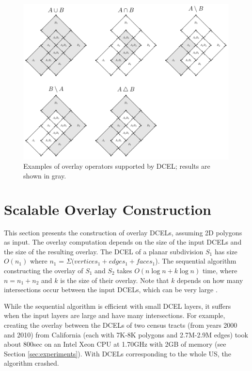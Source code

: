 \begin{figure}
    \centering
    \includegraphics[width=\textwidth]{chapterSDCEL/dcel_operators/dcel_operators}
    \caption{Examples of overlay operators supported by DCEL; results are shown in gray.}
    \label{fig:dcel_operators}
\end{figure}

\section{Scalable Overlay Construction}\label{sec:methods}
This section presents the construction of overlay DCELs, assuming 2D polygons as input. The overlay computation depends on the size of the input DCELs and the size of the resulting overlay. The DCEL of a planar subdivision $S_1$ has size $O(n_1)$ where $n_1$ = $\Sigma (vertices_1 + edges_1 + faces_1$).  The sequential algorithm constructing the overlay of $S_1$ and $S_2$ takes $O(n \log n + k \log n)$ time, where $n = n_1 + n_2$ and $k$ is the size of their overlay.  Note that $k$ depends on how many intersections occur between the input DCELs, which can be very large \cite{berg_computational_2008}.

While the sequential algorithm is efficient with small DCEL layers, it suffers when the input layers are large and have many intersections. For example, creating the overlay between the DCELs of two census tracts (from years 2000 and 2010) from California (each with 7K-8K polygons and 2.7M-2.9M edges) took about 800sec on an Intel Xeon CPU at 1.70GHz  with 2GB of memory (see Section \ref{sec:experiments}). With DCELs corresponding to the whole US, the algorithm crashed.

